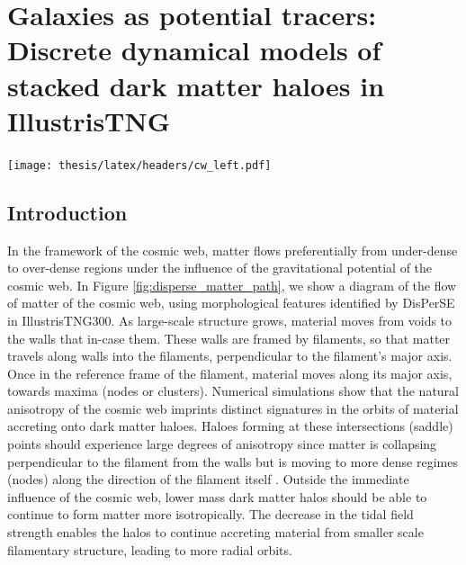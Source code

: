 \chapter[Discrete dynamical models of stacked dark matter haloes]{Galaxies as potential tracers: \\ Discrete dynamical models of stacked dark matter haloes in IllustrisTNG}
\label{ch:dyn_mod}
\vspace{-5.25in}
\texttt{[image: thesis/latex/headers/cw\_left.pdf]}
\vspace{3in}


\section{Introduction}
In the framework of the cosmic web, matter flows preferentially from under-dense to over-dense regions under the influence of the gravitational potential of the cosmic web. In Figure \ref{fig:disperse_matter_path}, we show a diagram of the flow of matter of the cosmic web, using morphological features identified by DisPerSE in IllustrisTNG300. As large-scale structure grows, material moves from voids to the walls that in-case them. These walls are framed by filaments, so that matter travels along walls into the filaments, perpendicular to the filament's major axis. Once in the reference frame of the filament, material moves along its major axis, towards maxima (nodes or clusters). Numerical simulations show that the natural anisotropy of the cosmic web imprints distinct signatures in the orbits of material accreting onto dark matter haloes. Haloes forming at these intersections (saddle) points should experience large degrees of anisotropy since matter is collapsing perpendicular to the filament from the walls but is moving to more dense regimes (nodes) along the direction of the filament itself \citep[e.g.][for galaxy properties in saddle environments]{kraljic2019saddle}. Outside the immediate influence of the cosmic web, lower mass dark matter halos should be able to continue to form matter more isotropically. The decrease in the tidal field strength enables the halos to continue accreting material from smaller scale filamentary structure, leading to more radial orbits.

